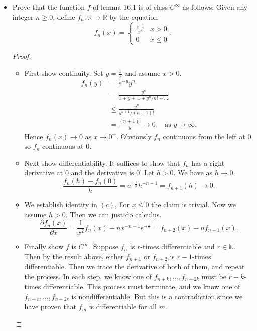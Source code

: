 \begin{itemize}
\begin{proof}
	Put everything together,
	\begin{align*}
		v(Y_\alpha)
		&= \int _A V(D \alpha) \\
		&= \int _A \sqrt{1+\sum_{i=1}^{k} \left( \frac{\partial f}{\partial x_i}  \right) ^2} 
	.\end{align*}

	

\end{proof}

\item [16.1] Prove that the function $f$ of lemma 16.1 is of class $C^{\infty } $ as follows: Given any integer $n\ge 0$, define $f_n: \mathbb{R} \to \mathbb{R}$ by the equation
	\[
		f_n(x) = \begin{cases}
			\frac{e^{-\frac{1}{x}}}{x^n} & x>0\\
			0 & x \le 0
		\end{cases}
	.\] 
\begin{proof}
	\begin{itemize}
		\item First show continuity. Set $y = \frac{1}{x}$ and assume $x>0$.
			\begin{align*}
				f_n(y) &= e^{- y} y^{n} \\
				&= \frac{y^n}{1+ y + \ldots + y^n / n! + \ldots} \\
				&\le \frac{y^n}{y^{n+1}/(n+1)!} \\
				&= \frac{(n+1)!}{y} \to 0 \quad \text{ as } y \to \infty 
			.\end{align*}
			Hence $f_n(x) \to 0$ as $x \to 0^+$. Obviously $f_n$ continuous from the left at $0$, so $f_n$ continuous at $0$.
		\item Next show differentiability. It suffices to show that $f_n$ has a right derivative at $0$ and the derivative is $0$. Let $h>0$. We have as $h \to 0$,
			\[
				\frac{f_n(h) - f_n(0)}{h} = e^{- \frac{1}{h}} h^{- n - 1} = f_{n+1}(h) \to 0
			.\] 
		\item We establish identity in $(c)$, For $x \le  0$ the claim is trivial. Now we assume $h > 0$. Then we can just do calculus.
			\[
			\frac{\partial f_n(x)}{\partial x}  = \frac{1}{x^2} f_n(x) - n x^{-n-1} e^{-\frac{1}{x}} = f_{n+2}(x) - n f_{n+1}\left( x \right) 
			.\] 
		\item Finally show $f$ is $C^{\infty }$. Suppose $f_n$ is $r$-times differentiable and $r \in \mathbb{N}$. Then by the result above, either $f_{n+1} $ or $f_{n+2}$ is $r-1$-times differentiable. Then we trace the derivative of both of them, and repeat the process. In each step, we know one of $f_{n + k} , \ldots, f_{n+ 2 k} $ must be $r - k$-times differentiable. This process must terminate, and we know one of $f_{n+r}, \ldots, f_{n+ 2r}$ is nondifferentiable. But this is a contradiction since we have proven that $f_m$ is differentiable for all $m$.

\end{itemize}
\end{proof}
\end{itemize}
